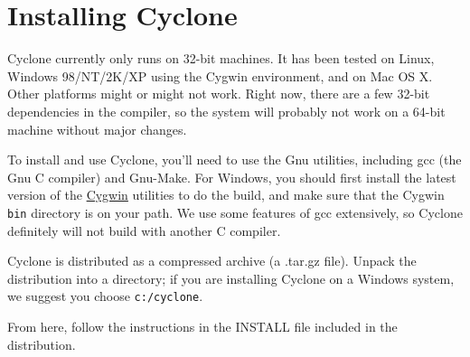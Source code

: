 \section{Installing Cyclone}
\label{sec:install}
Cyclone currently only runs on 32-bit machines.  It has been tested on
Linux, Windows 98/NT/2K/XP using the Cygwin environment, and on Mac OS
X\@.  Other platforms might or might not work.  Right now, there are a
few 32-bit dependencies in the compiler, so the system will probably
not work on a 64-bit machine without major changes.

To install and use Cyclone, you'll need to use the Gnu utilities,
including gcc (the Gnu C compiler) and Gnu-Make.  For Windows, you
should first install the latest version of the
\href{http://cygwin.com/}{Cygwin} utilities to do the build, and make
sure that the Cygwin \texttt{bin} directory is on your path. We use
some features of gcc extensively, so Cyclone definitely will not build
with another C compiler.

Cyclone is distributed as a compressed archive (a .tar.gz file).
Unpack the distribution into a directory; if you are installing
Cyclone on a Windows system, we suggest you choose
\texttt{c:/cyclone}.

From here, follow the instructions in the INSTALL file included in the
distribution.






